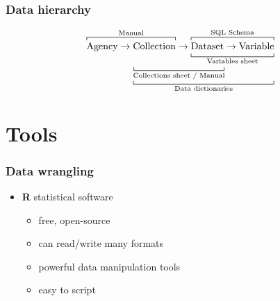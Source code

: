 \documentclass{beamer}
\newcommand{\prog}[1]{\textsf{\bfseries #1}}
\begin{document}
\begin{frame}
    \frametitle{Data hierarchy}

    \begin{center}

        \begin{align*}
            \overbracket[0.5pt]{\strut
            \text{Agency} \rightarrow
                \text{Collection}}^{\text{Manual}}
            \rightarrow
                    \underbracket[0.5pt]{\overbracket[0.5pt]{\strut
                    \text{Dataset} \rightarrow \text{Variable}
                    }^{\text{SQL Schema}}
                    }_{\text{Variables sheet}} \\[-1em]
                \hphantom{\text{Agency} \rightarrow}
                \underbracket[0.5pt]{
                \underbracket[0.5pt]{\hphantom{
                    \text{Collection} \rightarrow \text{Dataset}
                }}_{\text{Collections sheet / Manual}}
                \hphantom{\rightarrow \text{Variable}}
                }_{\text{Data dictionaries}}
        \end{align*}
    \end{center}
\end{frame}

\section{Tools}

\begin{frame}
    \frametitle{Data wrangling}

    \begin{itemize}
        \item \prog{R} statistical software
        \begin{itemize}
            \item free, open-source
            \item can read/write many formats
            \item powerful data manipulation tools
            \item easy to script
        \end{itemize}
    \end{itemize}
\end{frame}
\end{document}
